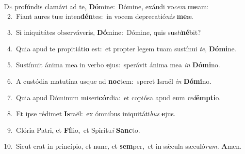 \lettrine{\initial\textcolor{\initialcolor}{D}}{e} profúndis clamávi ad te, \textbf{Dó}\-mine:~\star Dómine, exáudi vo\textit{cem} \textbf{me}\-am:\\
{\numbfont\textcolor{\numbcolor}{~2.}}~Fiant aures tuæ inten\-\textbf{dén}\-tes:~\star in vocem deprecatió\textit{nis} \textbf{me}\-æ.\par
{\numbfont\textcolor{\numbcolor}{~3.}}~Si iniquitátes observáveris, \textbf{Dó}\-mine:~\star Dómine, quis sus\-\textit{ti}\-\textbf{né}bit?\par
{\numbfont\textcolor{\numbcolor}{~4.}}~Quia apud te propitiáti\textbf{o} est:~\star et propter legem tuam sustínui \textit{te}\-, \textbf{Dó}\-\textbf{mi}ne.\par
{\numbfont\textcolor{\numbcolor}{~5.}}~Sustínuit ánima mea in verbo \textbf{e}\-jus:~\star sperávit ánima mea \textit{in} \textbf{Dó}\-\textbf{mi}no.\par
{\numbfont\textcolor{\numbcolor}{~6.}}~A custódia matutína usque ad \textbf{noc}\-tem:~\star speret Israël \textit{in} \textbf{Dó}\-\textbf{mi}no.\par
{\numbfont\textcolor{\numbcolor}{~7.}}~Quia apud Dóminum miseri\-\textbf{cór}\-dia:~\star et copiósa apud eum \textit{red}\-\textbf{émp}\textbf{ti}o.\par
{\numbfont\textcolor{\numbcolor}{~8.}}~Et ipse rédimet \textbf{Is}\-raël:~\star ex ómnibus iniquitáti\textit{bus} \textbf{e}\-jus.\par
{\numbfont\textcolor{\numbcolor}{~9.}}~Glória Patri, et \textbf{Fí}\-lio,~\star et Spirítu\textit{i} \textbf{Sanc}\-to.\par
{\numbfont\textcolor{\numbcolor}{10.}}~Sicut erat in princípio, et nunc, et \textbf{sem}\-per,~\star et in sǽcula sæculó\-\textit{rum}\-. \textbf{A}\-men.\par
